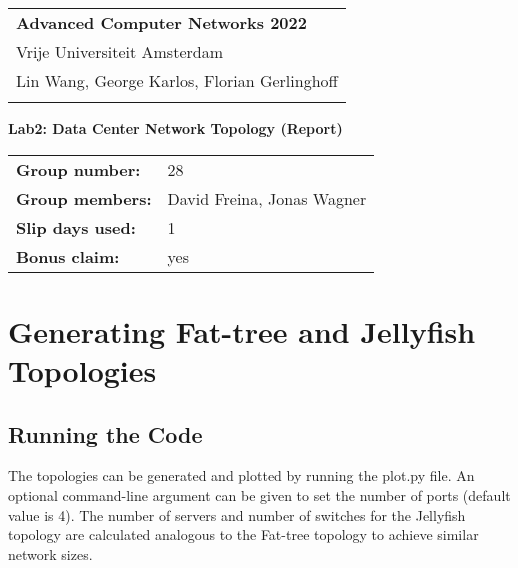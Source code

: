\documentclass[a4paper,11pt]{article}
\begin{document}
\thispagestyle{empty}

\begin{tabular}{@{}p{15.5cm}}
{\bf Advanced Computer Networks 2022} \\
Vrije Universiteit Amsterdam  \\ Lin Wang, George Karlos, Florian Gerlinghoff\\
\hline
\\
\end{tabular}

\vspace*{0.3cm}

{\LARGE \bf Lab2: Data Center Network Topology (Report)}

\vspace*{0.3cm}


\begin{tcolorbox}[sharp corners, colback=blue!5!white]
\begin{tabular}{@{}ll}
\textbf{Group number:} & 28 \\
\textbf{Group members:} & David Freina, Jonas Wagner \\
\textbf{Slip days used:} & 1 \\
\textbf{Bonus claim:} & yes
\end{tabular}
\end{tcolorbox}

\vspace{0.4cm}


\section{Generating Fat-tree and Jellyfish Topologies}



\subsection{Running the Code}

The topologies can be generated and plotted by running the plot.py file.
An optional command-line argument can be given to set the number of ports (default value is 4).
The number of servers and number of switches for the Jellyfish topology are calculated analogous to the Fat-tree topology to achieve similar network sizes.
\end{document}
